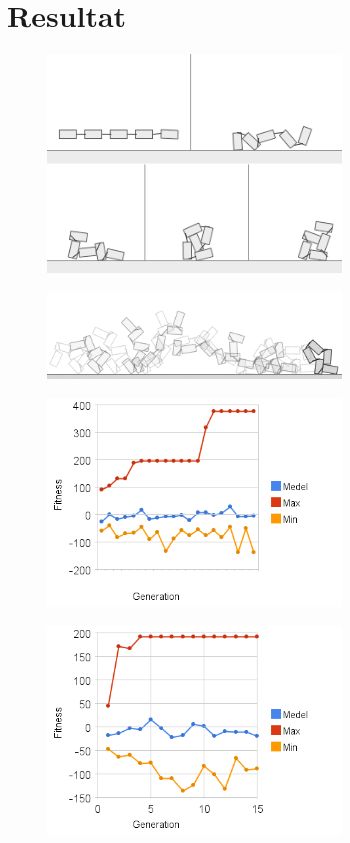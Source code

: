 \documentclass[titlepage, twocolumn, a4paper, 12pt]{article}
\begin{document}
\section{Resultat}
\begin{figure}
    \includegraphics[width=78mm]{images/mask1_gs.png}
\end{figure}

\begin{figure}
    \includegraphics[width=78mm]{images/maskninja.png}
\end{figure}

\begin{figure}
    \includegraphics[width=78mm]{images/diagram4.png}
\end{figure}

\begin{figure}
    \includegraphics[width=78mm]{images/diagram3.png}
\end{figure}
\end{document}

